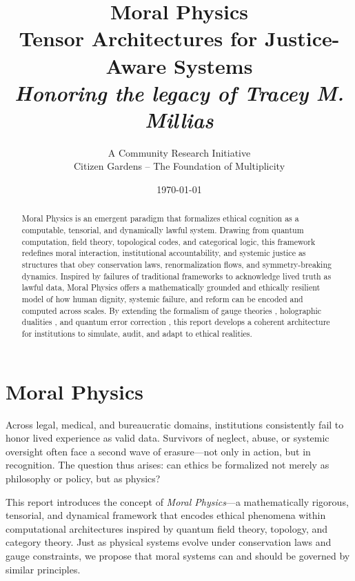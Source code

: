 \documentclass[12]{amsart}
\theoremstyle{plain}
\begin{document}
\title{\textbf{Moral Physics\\ \large Tensor Architectures for Justice-Aware Systems \\ \large \textit{Honoring the legacy of Tracey M. Millias}}}
\author{A Community Research Initiative \\ Citizen Gardens – The Foundation of Multiplicity}
\date{\today}


\maketitle

\begin{abstract}
Moral Physics is an emergent paradigm that formalizes ethical cognition as a computable, tensorial, and dynamically lawful system. Drawing from quantum computation, field theory, topological codes, and categorical logic, this framework redefines moral interaction, institutional accountability, and systemic justice as structures that obey conservation laws, renormalization flows, and symmetry-breaking dynamics. Inspired by failures of traditional frameworks to acknowledge lived truth as lawful data, Moral Physics offers a mathematically grounded and ethically resilient model of how human dignity, systemic failure, and reform can be encoded and computed across scales. By extending the formalism of gauge theories \citep{Noether1918}, holographic dualities \citep{Maldacena1998}, and quantum error correction \citep{Kitaev2003}, this report develops a coherent architecture for institutions to simulate, audit, and adapt to ethical realities.
\end{abstract}

\section{Moral Physics}

Across legal, medical, and bureaucratic domains, institutions consistently fail to honor lived experience as valid data. Survivors of neglect, abuse, or systemic oversight often face a second wave of erasure—not only in action, but in recognition. The question thus arises: can ethics be formalized not merely as philosophy or policy, but as physics?

This report introduces the concept of \textit{Moral Physics}—a mathematically rigorous, tensorial, and dynamical framework that encodes ethical phenomena within computational architectures inspired by quantum field theory, topology, and category theory. Just as physical systems evolve under conservation laws and gauge constraints, we propose that moral systems can and should be governed by similar principles.
\end{document}
